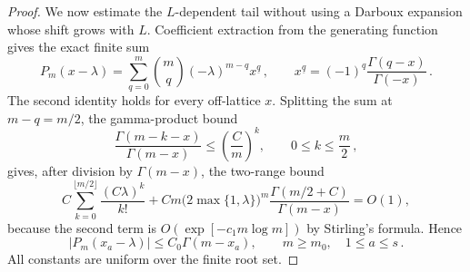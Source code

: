 \documentclass[a4paper,11pt]{article}
\theoremstyle{definition}
\theoremstyle{remark}
\begin{document}
\begin{proof}
We now estimate the \(L\)-dependent tail without using a Darboux
expansion whose shift grows with \(L\). Coefficient extraction from the
generating function gives the exact finite sum
\begin{equation}
   P_m(x-\lambda)
   =
   \sum_{q=0}^{m}
   \binom{m}{q}(-\lambda)^{m-q}x^{\underline q}\,,
   \qquad
   x^{\underline q}
   =(-1)^q\frac{\Gamma(q-x)}{\Gamma(-x)}\,.
   \label{eq:H1-exact-fixed-point-finite-sum-app}
\end{equation}
The second identity holds for every off-lattice \(x\). Splitting the sum at \(m-q=m/2\), the gamma-product bound
\begin{equation}
   \frac{\Gamma(m-k-x)}{\Gamma(m-x)}
   \le \left(\frac{C}{m}\right)^k,
   \qquad 0\le k\le\frac m2\,,
\end{equation}
gives, after division by \(\Gamma(m-x)\), the two-range bound
\begin{equation}
   C\sum_{k=0}^{\lfloor m/2\rfloor}\frac{(C\lambda)^k}{k!}
   +
   Cm\bigl(2\max\{1,\lambda\}\bigr)^m
   \frac{\Gamma(m/2+C)}{\Gamma(m-x)}
   =O(1),
   \label{eq:H1-exact-sum-uniform-bound-app}
\end{equation}
because the second term is
\(O(\exp[-c_1m\log m])\) by Stirling's formula. Hence
\begin{equation}
   |P_m(x_a-\lambda)|
   \le C_0\Gamma(m-x_a),
   \qquad m\ge m_0,\quad 1\le a\le s\,.
   \label{eq:H1-uniform-fixed-point-bound-app}
\end{equation}
All constants are uniform over the finite root set.


\end{proof}
\end{document}
